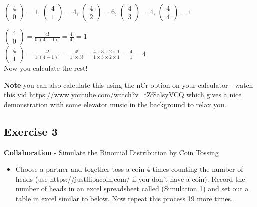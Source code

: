 \documentclass[
  10pt,
  letterpaper,
  DIV=11,
  numbers=noendperiod]{scrartcl}
\providecommand{\tightlist}{%
  \setlength{\itemsep}{0pt}\setlength{\parskip}{0pt}}\usepackage{longtable,booktabs,array}
\begin{document}
\(\left(\begin{matrix}4\\0\end{matrix}\right)=1\),
\(\left(\begin{matrix}4\\1\end{matrix}\right)=4\),
\(\left(\begin{matrix}4\\2\end{matrix}\right)=6\),
\(\left(\begin{matrix}4\\3\end{matrix}\right)=4\),
\(\left(\begin{matrix}4\\4\end{matrix}\right)=1\)

\(\left(\begin{matrix}4\\0\end{matrix}\right)=\frac{4!}{0!(4-0)!}=\frac{4!}{4!}=1\)\\
\(\left(\begin{matrix}4\\1\end{matrix}\right)=\frac{4!}{1!(4-1)!}=\frac{4!}{1!\times3!}=\frac{4\times3\times2\times1}{1\times3\times2\times1}=\frac{4}{1}=4\)\\

Now you calculate the rest!

\textbf{Note} you can also calculate this using the nCr option on your
calculator - watch this vid https://www.youtube.com/watch?v=tZf8alsyVCQ
which gives a nice demonstration with some elevator music in the
background to relax you.

\hypertarget{exercise-3}{%
\subsection{Exercise 3}\label{exercise-3}}

\textbf{Collaboration} - Simulate the Binomial Distribution by Coin
Tossing

\begin{itemize}
\tightlist
\item
  Choose a partner and together toss a coin 4 times counting the number
  of heads (use https://justflipacoin.com/ if you don't have a coin).
  Record the number of heads in an excel spreadsheet called (Simulation
  1) and set out a table in excel similar to below. Now repeat this
  process 19 more times.\\
\end{itemize}
\end{document}
